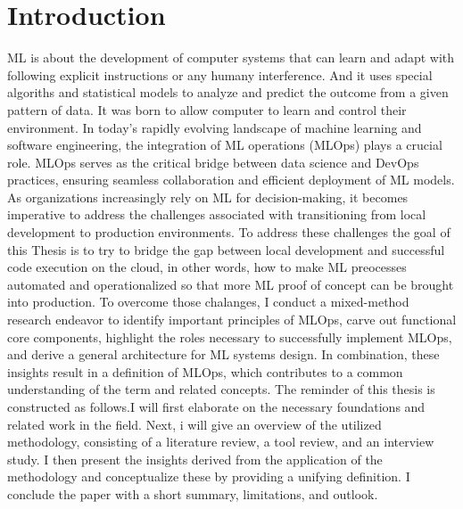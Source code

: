 \chapter{Introduction}\label{chapter:introduction}

\ac{ML} is about the development of computer systems that can learn and adapt with following explicit instructions or any humany interference. And it uses special algoriths and statistical models to analyze and predict the outcome from a given pattern of data. It was born to allow computer to learn and control their environment.\newline
In today’s rapidly evolving landscape of machine learning and software engineering, the integration of \ac{ML} operations (\ac{MLOps}) plays a crucial role. \ac{MLOps} serves as the critical bridge between data science and DevOps practices, ensuring seamless collaboration and efficient deployment of \ac{ML} models. As organizations increasingly rely on \ac{ML} for decision-making, it becomes imperative to address the challenges associated with transitioning from local development to production environments.
\newline
To address these  challenges the goal of this Thesis is to try to bridge the gap between local development and successful code execution on the cloud, in other words, how to make \ac{ML} preocesses automated and operationalized so that more \ac{ML} proof of concept can be brought into production.
\newline
To overcome those chalanges, I conduct a mixed-method research
endeavor to identify important principles of \ac{MLOps}, carve
out functional core components, highlight the roles necessary to
successfully implement \ac{MLOps}, and derive a general
architecture for \ac{ML} systems design. In combination, these insights
result in a definition of \ac{MLOps}, which contributes to a common
understanding of the term and related concepts. 
\newline
The reminder of this thesis is constructed as follows.I will first
elaborate on the necessary foundations and related work in the field.
Next, i will give an overview of the utilized methodology,
consisting of a literature review, a tool review, and an interview
study. I then present the insights derived from the application of
the methodology and conceptualize these by providing a unifying
definition. I conclude the paper with a short summary,
limitations, and outlook.